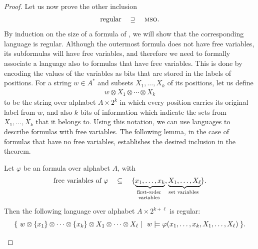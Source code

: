 \begin{proof}
Let us now prove the other inclusion     \begin{align*}    \text{regular} \quad \supseteq \quad \text{{\textsc{mso}}.}
    \end{align*}
    By induction on the size of a formula of \mso, we will show that the corresponding language is regular. Although the outermost formula does not have free variables, its subformulas will have free variables, and therefore we need to formally associate a language also to formulas that  have free variables. This is done by encoding the values of the variables as bits that are stored in the labels of positions. For a string $w \in A^*$ and subsets $X_1,\ldots,X_k$ of its positions, let us define 
    \begin{align*}
    w \otimes X_1 \otimes \cdots \otimes X_k 
    \end{align*}
    to be the string over alphabet $A \times 2^k$ in which every position carries its original label from $w$, and also $k$ bits of information which indicate the sets from $X_1,\ldots,X_k$ that it belongs to.  Using this notation, we can use languages to describe formulas with free variables. The following lemma, in the case of formulas that have no free variables, establishes the desired inclusion in the theorem. 
    \begin{lemma}\label{lem:mso-free-variables} Let $\varphi$ be an \mso formula over alphabet $A$, with
        \begin{align*}
            \text{free variables of $\varphi$} \quad \subseteq \quad 
        \set{\myunderbrace{x_1,\ldots,x_k}{first-order\\ variables}, 
        \myunderbrace{X_1,\ldots,X_\ell}{set  variables}}.
        \end{align*}
        Then the following language over alphabet $A \times 2^{k+\ell}$ is regular:
        \begin{align*}
        \setbuild{w \otimes \set{x_1} \otimes \cdots  \otimes \set{x_k} \otimes X_1 \otimes \cdots \otimes X_\ell}{$w \models \varphi(x_1,\ldots,x_k,X_1,\ldots,X_\ell)$}.   
        \end{align*}
    \end{lemma}


\end{proof}
